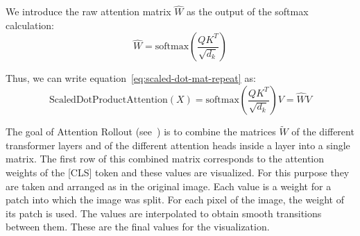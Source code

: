 \documentclass[a4paper]{scrartcl}
\begin{document}
    We introduce the raw attention matrix $\hat{W}$ as the output of the softmax calculation:
    \begin{equation}
        \hat{W} = \text{softmax}(\frac{QK^T}{\sqrt {d_k}})
    \end{equation}

    Thus, we can write equation~\ref{eq:scaled-dot-mat-repeat} as:
    \begin{equation}
        \text{ScaledDotProductAttention}(X) = \text{softmax}(\frac{QK^T}{\sqrt {d_k}})V = \hat{W}V \label{eq:scaled-dot-mat-w}
    \end{equation}

    The goal of Attention Rollout (see~\cite{abnar2020quantifying}) is to combine the matrices $\tilde{W}$ of the different transformer layers and of the different attention heads inside a layer into a single matrix.
    The first row of this combined matrix corresponds to the attention weights of the [CLS] token and these values are visualized.
    For this purpose they are taken and arranged as in the original image.
    Each value is a weight for a patch into which the image was split.
    For each pixel of the image, the weight of its patch is used.
    The values are interpolated to obtain smooth transitions between them.
    These are the final values for the visualization.
\end{document}
